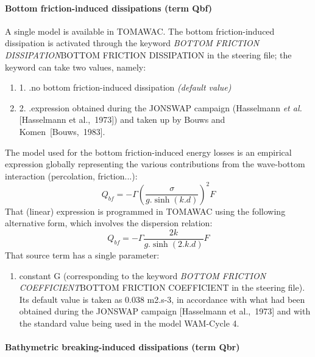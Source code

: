 \paragraph{ Bottom friction-induced dissipations (term Qbf)}

 A single model is available in TOMAWAC. The bottom friction-induced dissipation is activated through the keyword \textit{BOTTOM FRICTION DISSIPATION}BOTTOM FRICTION DISSIPATION\textit{ }in the steering file; the keyword can take two values, namely:

 \begin{enumerate}
\item 1. .no bottom friction-induced dissipation \textit{(default value)}

 \item 2. .expression obtained during the JONSWAP campaign (Hasselmann \textit{et al.} [Hasselmann et al.,~1973]) and taken up by Bouws and Komen~[Bouws,~1983].
\end{enumerate}

 The model used for the bottom friction-induced energy losses is an empirical expression globally representing the various contributions from the wave-bottom interaction (percolation, friction...):
\begin{equation} \label{GrindEQ__4_42_}
Q_{bf} =-\Gamma \left(\frac{\sigma }{g.\sinh \left(k.d\right)} \right)^{2} F
\end{equation}
That (linear) expression is programmed in TOMAWAC using the following alternative form, which involves the dispersion relation:
\begin{equation} \label{GrindEQ__4_43_}
Q_{bf} =-\Gamma \frac{2k}{g.\sinh \left(2.k.d\right)} F
\end{equation}
That source term has a single parameter:

\begin{enumerate}
\item  constant G (corresponding to the keyword \textit{BOTTOM FRICTION COEFFICIENT}BOTTOM FRICTION COEFFICIENT\textit{ }in the steering file). Its default value is taken as 0.038 m2.s-3, in accordance with what had been obtained during the JONSWAP campaign [Hasselmann et al.,~1973] and with the standard value being used in the model WAM-Cycle 4.
\end{enumerate}


\paragraph{ Bathymetric breaking-induced dissipations (term Qbr)}

